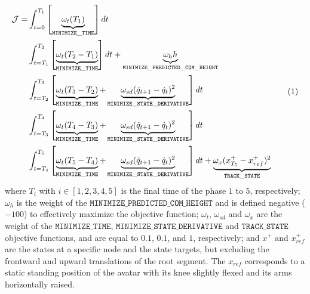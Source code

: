 \[ 
\resizebox{0.9\columnwidth}{!}{$ 
\begin{aligned}
\mathcal{J} = 
  &\int_{t=0}^{T_1}\left[\underbrace{\omega_{t} (T_1)}_{\mathtt{MINIMIZE\_TIME}}\right]dt\\
  &\int_{t=T_1}^{T_2}\left[\underbrace{\omega_{t} (T_2 - T_1)}_{\mathtt{MINIMIZE\_TIME}}\right]dt + \underbrace{\omega_h h}_{\mathtt{MINIMIZE\_PREDICTED\_COM\_HEIGHT}}\\
  &\int_{t=T_2}^{T_3}\left[\underbrace{\omega_{t} (T_3 - T_2)}_{\mathtt{MINIMIZE\_TIME}} + \underbrace{\omega_{sd} (\dot{q}_{t+1} - \dot{q}_t)^2}_{\mathtt{MINIMIZE\_STATE\_DERIVATIVE}}\right]dt\\
  &\int_{t=T_3}^{T_4}\left[\underbrace{\omega_{t} (T_4 - T_3)}_{\mathtt{MINIMIZE\_TIME}} + \underbrace{\omega_{sd} (\dot{q}_{t+1} - \dot{q}_t)^2}_{\mathtt{MINIMIZE\_STATE\_DERIVATIVE}}\right]dt\\
  &\int_{t=T_4}^{T_5}\left[\underbrace{\omega_{t} (T_5 - T_4)}_{\mathtt{MINIMIZE\_TIME}} + \underbrace{\omega_{sd} (\dot{q}_{t+1} - \dot{q}_t)^2}_{\mathtt{MINIMIZE\_STATE\_DERIVATIVE}}\right]dt + \underbrace{\omega_{x} (x^+_{T_5} - x^+_{ref})^2}_{\mathtt{TRACK\_STATE}}\\
\end{aligned} 
$}  
\addtag  
\label{eq:cost_jumper}
\]
where $T_i$ with $i \in [1, 2, 3, 4, 5]$ is the final time of the phase $1$ to $5$, respectively; 
$\omega_h$ is the weight of the $\mathtt{MINIMIZE\_PREDICTED\_COM\_HEIGHT}$ and is defined negative ($-100$) to effectively maximize the objective function; 
$\omega_t$, $\omega_{sd}$ and $\omega_x$ are the weight of the $\mathtt{MINIMIZE\_TIME}$,  $\mathtt{MINIMIZE\_STATE\_DERIVATIVE}$ and $\mathtt{TRACK\_STATE}$ objective functions, and are equal to $0.1$, $0.1$, and $1$, respectively; 
and $x^+$ and $x^+_{ref}$ are the states at a specific node and the state targets, but excluding the frontward and upward translations of the root segment. 
The $x_{ref}$ corresponds to a static standing position of the avatar with its knee slightly flexed and its arms horizontally raised.




